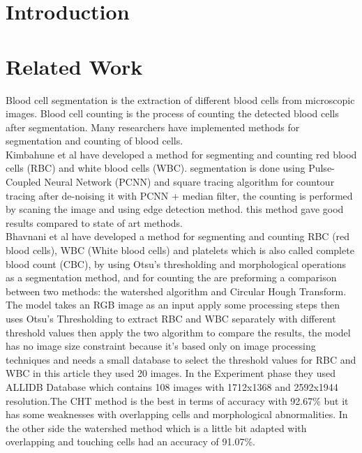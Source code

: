 \section{Introduction}
\vspace{0.2in}
\hspace*{0.16in}

\section{Related Work}
\vspace{0.2in}
\hspace*{0.16in}
Blood cell segmentation is the extraction of different blood cells from microscopic images. Blood cell counting is the process of counting the detected blood cells after segmentation. Many researchers have implemented methods for segmentation and counting of blood cells.\\

Kimbahune et al \textsuperscript{\cite{kimbahune2011blood}} have developed a method for segmenting and counting red blood cells (RBC) and white blood cells (WBC).
segmentation is done using Pulse-Coupled Neural Network (PCNN) and square tracing algorithm for countour tracing after de-noising it with PCNN + median filter, the counting is performed by scaning the image and using edge detection method. this method gave good results compared to state of art methods.\\

Bhavnani et al \textsuperscript{\cite{bhavnani2016segmentation}} have developed a method for segmenting and counting RBC (red blood cells), WBC (White blood cells) and platelets which is also called complete blood count (CBC), by using Otsu’s thresholding and morphological operations as a segmentation method, and for counting the are preforming a comparison between two methods: the watershed algorithm and Circular Hough Transform. The model takes an RGB image as an input apply some processing steps then uses Otsu's Thresholding to extract RBC and WBC separately with different threshold values then apply the two algorithm to compare the results, the model has no image size constraint because it's based only on image processing techniques and needs a small database to select the threshold values for RBC and WBC in this article they used 20 images. In the Experiment phase they used ALLIDB Database which contains 108 images with 1712x1368 and 2592x1944 resolution.The CHT method is the best in terms of accuracy with 92.67\% but it has some weaknesses with overlapping cells and morphological abnormalities. In the other side the watershed method which is a little bit adapted with overlapping and touching cells had an accuracy of 91.07\%.\\

